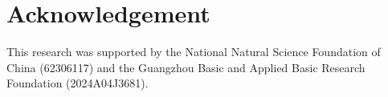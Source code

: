 \documentclass{article}
\begin{document}
\section{Acknowledgement}
This research was supported by the National Natural Science Foundation of China (62306117) and the Guangzhou Basic and Applied Basic Research Foundation (2024A04J3681).




\clearpage
\appendix





\end{document}
